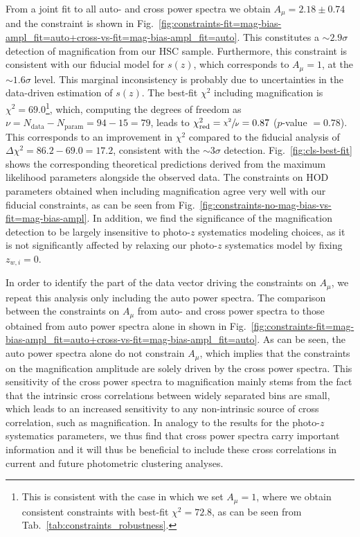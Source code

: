 \documentclass[a4paper,11pt]{article}
\begin{document}
    From a joint fit to all auto- and cross power spectra we obtain $A_{\mu} = 2.18 \pm 0.74$ and the constraint is shown in Fig.~\ref{fig:constraints-fit=mag-bias-ampl_fit=auto+cross-vs-fit=mag-bias-ampl_fit=auto}. This constitutes a $\sim 2.9 \sigma$ detection of magnification from our HSC sample. Furthermore, this constraint is consistent with our fiducial model for $s(z)$, which corresponds to $A_{\mu} = 1$, at the $\sim 1.6 \sigma$ level. This marginal inconsistency is probably due to uncertainties in the data-driven estimation of $s(z)$. The best-fit $\chi^{2}$ including magnification is $\chi^{2} = 69.0$\footnote{This is consistent with the case in which we set $A_{\mu}=1$, where we obtain consistent constraints with best-fit $\chi^{2} = 72.8$, as can be seen from Tab.~\ref{tab:constraints_robustness}.}, which, computing the degrees of freedom as $\nu = N_{\mathrm{data}} - N_{\mathrm{param}} = 94 - 15 = 79$, leads to $\chi^{2}_{\mathrm{red}} = \sfrac{\chi^{2}}{\nu} = 0.87$ ($p$-value $= 0.78$). This corresponds to an improvement in $\chi^{2}$ compared to the fiducial analysis of $\Delta \chi^{2} = 86.2 - 69.0 = 17.2$, consistent with the $\sim 3 \sigma$ detection. Fig.~\ref{fig:cls-best-fit} shows the corresponding theoretical predictions derived from the maximum likelihood parameters alongside the observed data. The constraints on HOD parameters obtained when including magnification agree very well with our fiducial constraints, as can be seen from Fig.~\ref{fig:constraints-no-mag-bias-vs-fit=mag-bias-ampl}. In addition, we find the significance of the magnification detection to be largely insensitive to photo-$z$ systematics modeling choices, as it is not significantly affected by relaxing our photo-$z$ systematics model by fixing $z_{w, i} = 0$. 

    In order to identify the part of the data vector driving the constraints on $A_{\mu}$, we repeat this analysis only including the auto power spectra. The comparison between the constraints on $A_{\mu}$ from auto- and cross power spectra to those obtained from auto power spectra alone in shown in Fig.~\ref{fig:constraints-fit=mag-bias-ampl_fit=auto+cross-vs-fit=mag-bias-ampl_fit=auto}. As can be seen, the auto power spectra alone do not constrain $A_{\mu}$, which implies that the constraints on the magnification amplitude are solely driven by the cross power spectra. This sensitivity of the cross power spectra to magnification mainly stems from the fact that the intrinsic cross correlations between widely separated bins are small, which leads to an increased sensitivity to any non-intrinsic source of cross correlation, such as magnification. In analogy to the results for the photo-$z$ systematics parameters, we thus find that cross power spectra carry important information and it will thus be beneficial to include these cross correlations in current and future photometric clustering analyses. 
\end{document}
